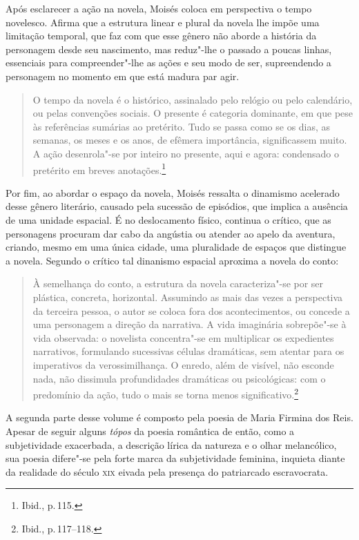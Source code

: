 Após esclarecer a ação na novela, Moisés coloca em perspectiva o tempo novelesco. Afirma que a estrutura linear e plural da novela lhe impõe uma limitação temporal, que faz com que esse gênero não aborde a história da personagem desde seu nascimento, mas reduz"-lhe o passado a poucas linhas, essenciais para compreender"-lhe as ações e seu modo de ser, supreendendo a personagem no momento em que está madura par agir.

\begin{quote}
O tempo da novela é o histórico, assinalado pelo relógio ou pelo calendário, ou pelas convenções sociais. O presente é categoria dominante, em que pese às referências sumárias ao pretérito. Tudo se passa como se os dias, as semanas, os meses e os anos, de efêmera importância, significassem muito. A ação desenrola"-se por inteiro no presente, aqui e agora: condensado o pretérito em breves anotações.\footnote{Ibid., p.\,115.}
\end{quote}

Por fim, ao abordar o espaço da novela, Moisés ressalta o dinamismo acelerado desse gênero literário, causado pela sucessão de episódios, que implica a ausência de uma unidade espacial. É no deslocamento físico, continua o crítico, que as personagens procuram dar cabo da angústia ou atender ao apelo da aventura, criando, mesmo em uma única cidade, uma pluralidade de espaços que distingue a novela. Segundo o crítico tal dinanismo espacial aproxima a novela do conto:

\begin{quote}
À semelhança do conto, a estrutura da novela caracteriza"-se por ser plástica, concreta, horizontal. Assumindo as mais das vezes a perspectiva da terceira pessoa, o autor se coloca fora dos acontecimentos, ou concede a uma personagem a direção da narrativa. A vida imaginária sobrepõe"-se à vida observada: o novelista concentra"-se em multiplicar os expedientes narrativos, formulando sucessivas células dramáticas, sem atentar para os imperativos da verossimilhança. O enredo, além de visível, não esconde nada, não dissimula profundidades dramáticas ou psicológicas: com o predomínio da ação, tudo o mais se torna menos significativo.\footnote{Ibid., p.\,117--118.}
\end{quote}

A segunda parte desse volume é composto pela poesia de Maria Firmina dos Reis.
Apesar de seguir alguns \textit{tópos} da poesia romântica de então, como a subjetividade exacerbada, a descrição lírica da natureza e o olhar melancólico, 
sua poesia difere"-se pela forte marca da subjetividade feminina, inquieta diante da realidade do século \textsc{xix} eivada pela presença do patriarcado escravocrata.

